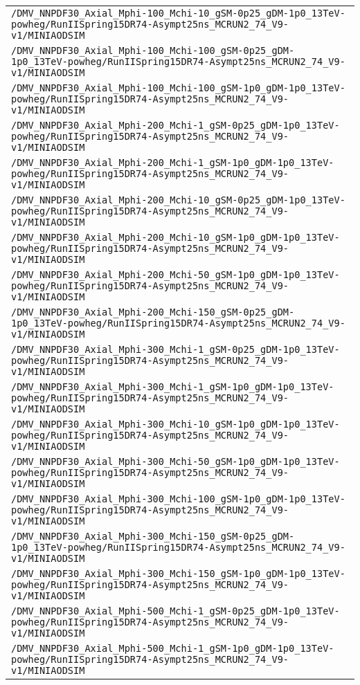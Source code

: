 \begin{center}
\begin{tabular}{l}
\verb!/DMV_NNPDF30_Axial_Mphi-100_Mchi-10_gSM-0p25_gDM-1p0_13TeV-powheg/RunIISpring15DR74-Asympt25ns_MCRUN2_74_V9-v1/MINIAODSIM! \tabularnewline
\verb!/DMV_NNPDF30_Axial_Mphi-100_Mchi-100_gSM-0p25_gDM-1p0_13TeV-powheg/RunIISpring15DR74-Asympt25ns_MCRUN2_74_V9-v1/MINIAODSIM! \tabularnewline
\verb!/DMV_NNPDF30_Axial_Mphi-100_Mchi-100_gSM-1p0_gDM-1p0_13TeV-powheg/RunIISpring15DR74-Asympt25ns_MCRUN2_74_V9-v1/MINIAODSIM! \tabularnewline
\verb!/DMV_NNPDF30_Axial_Mphi-200_Mchi-1_gSM-0p25_gDM-1p0_13TeV-powheg/RunIISpring15DR74-Asympt25ns_MCRUN2_74_V9-v1/MINIAODSIM! \tabularnewline
\verb!/DMV_NNPDF30_Axial_Mphi-200_Mchi-1_gSM-1p0_gDM-1p0_13TeV-powheg/RunIISpring15DR74-Asympt25ns_MCRUN2_74_V9-v1/MINIAODSIM! \tabularnewline
\verb!/DMV_NNPDF30_Axial_Mphi-200_Mchi-10_gSM-0p25_gDM-1p0_13TeV-powheg/RunIISpring15DR74-Asympt25ns_MCRUN2_74_V9-v1/MINIAODSIM! \tabularnewline
\verb!/DMV_NNPDF30_Axial_Mphi-200_Mchi-10_gSM-1p0_gDM-1p0_13TeV-powheg/RunIISpring15DR74-Asympt25ns_MCRUN2_74_V9-v1/MINIAODSIM! \tabularnewline
\verb!/DMV_NNPDF30_Axial_Mphi-200_Mchi-50_gSM-1p0_gDM-1p0_13TeV-powheg/RunIISpring15DR74-Asympt25ns_MCRUN2_74_V9-v1/MINIAODSIM! \tabularnewline
\verb!/DMV_NNPDF30_Axial_Mphi-200_Mchi-150_gSM-0p25_gDM-1p0_13TeV-powheg/RunIISpring15DR74-Asympt25ns_MCRUN2_74_V9-v1/MINIAODSIM! \tabularnewline
\verb!/DMV_NNPDF30_Axial_Mphi-300_Mchi-1_gSM-0p25_gDM-1p0_13TeV-powheg/RunIISpring15DR74-Asympt25ns_MCRUN2_74_V9-v1/MINIAODSIM! \tabularnewline
\verb!/DMV_NNPDF30_Axial_Mphi-300_Mchi-1_gSM-1p0_gDM-1p0_13TeV-powheg/RunIISpring15DR74-Asympt25ns_MCRUN2_74_V9-v1/MINIAODSIM! \tabularnewline
\verb!/DMV_NNPDF30_Axial_Mphi-300_Mchi-10_gSM-1p0_gDM-1p0_13TeV-powheg/RunIISpring15DR74-Asympt25ns_MCRUN2_74_V9-v1/MINIAODSIM! \tabularnewline
\verb!/DMV_NNPDF30_Axial_Mphi-300_Mchi-50_gSM-1p0_gDM-1p0_13TeV-powheg/RunIISpring15DR74-Asympt25ns_MCRUN2_74_V9-v1/MINIAODSIM! \tabularnewline
\verb!/DMV_NNPDF30_Axial_Mphi-300_Mchi-100_gSM-1p0_gDM-1p0_13TeV-powheg/RunIISpring15DR74-Asympt25ns_MCRUN2_74_V9-v1/MINIAODSIM! \tabularnewline
\verb!/DMV_NNPDF30_Axial_Mphi-300_Mchi-150_gSM-0p25_gDM-1p0_13TeV-powheg/RunIISpring15DR74-Asympt25ns_MCRUN2_74_V9-v1/MINIAODSIM! \tabularnewline
\verb!/DMV_NNPDF30_Axial_Mphi-300_Mchi-150_gSM-1p0_gDM-1p0_13TeV-powheg/RunIISpring15DR74-Asympt25ns_MCRUN2_74_V9-v1/MINIAODSIM! \tabularnewline
\verb!/DMV_NNPDF30_Axial_Mphi-500_Mchi-1_gSM-0p25_gDM-1p0_13TeV-powheg/RunIISpring15DR74-Asympt25ns_MCRUN2_74_V9-v1/MINIAODSIM! \tabularnewline
\verb!/DMV_NNPDF30_Axial_Mphi-500_Mchi-1_gSM-1p0_gDM-1p0_13TeV-powheg/RunIISpring15DR74-Asympt25ns_MCRUN2_74_V9-v1/MINIAODSIM! \tabularnewline

\end{tabular}
\end{center}
